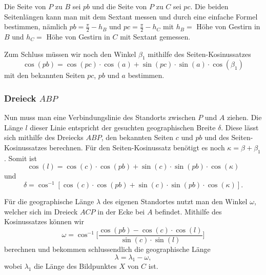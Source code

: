 Die Seite von $P$ zu $B$ sei $pb$ und die Seite von $P$ zu $C$ sei $pc$.
Die beiden Seitenlängen kann man mit dem Sextant messen und durch eine einfache Formel bestimmen, nämlich $pb=\frac{\pi}{2} - h_{B}$ und $pc=\frac{\pi}{2} - h_{C}$ 
mit $h_B=$ Höhe von Gestirn in $B$ und $h_C=$ Höhe von Gestirn in $C$ mit Sextant gemessen.

Zum Schluss müssen wir noch den Winkel $\beta_1$ mithilfe des Seiten-Kosinussatzes \[\cos(pb)=\cos(pc)\cdot\cos(a)+\sin(pc)\cdot\sin(a)\cdot\cos(\beta_1)\]  mit den bekannten Seiten $pc$, $pb$ und $a$ bestimmen. 
\subsubsection{Dreieck $ABP$}
Nun muss man eine Verbindungslinie des Standorts zwischen $P$ und $A$ ziehen. Die Länge $l$ dieser Linie entspricht der gesuchten geographischen Breite $\delta$. Diese lässt sich mithilfe des Dreiecks $ABP$, den bekannten Seiten $c$ und $pb$ und des Seiten-Kosinussatzes berechnen.
Für den Seiten-Kosinussatz benötigt es noch $\kappa=\beta + \beta_1$.
Somit ist \[\cos(l) = \cos(c)\cdot \cos(pb) + \sin(c) \cdot \sin(pb) \cdot \cos(\kappa)\]
und
\[
\delta  =\cos^{-1} [\cos(c) \cdot \cos(pb) + \sin(c) \cdot \sin(pb) \cdot \cos(\kappa)].
\]

Für die geographische Länge $\lambda$ des eigenen Standortes nutzt man den Winkel $\omega$, welcher sich im Dreieck $ACP$ in der Ecke bei $A$ befindet. 
Mithilfe des Kosinussatzes können wir \[\omega = \cos^{-1}  \bigg[\frac{\cos(pb)-\cos(c) \cdot \cos(l)}{\sin(c) \cdot \sin(l)}\bigg]\] berechnen und bekommen schlussendlich die geographische Länge 
\[\lambda=\lambda_1 - \omega,\]
wobei $\lambda_1$ die Länge des Bildpunktes $X$ von $C$ ist.
